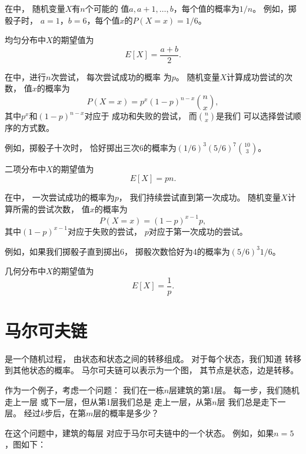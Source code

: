 在中，
随机变量$X$有$n$个可能的
值$a,a+1,\ldots,b$，每个值的概率为$1/n$。
例如，掷骰子时，
$a=1$，$b=6$，每个值$x$的$P(X=x)=1/6$。

均匀分布中$X$的期望值为
\[E[X] = \frac{a+b}{2}.\]

在中，进行$n$次尝试，
每次尝试成功的概率
为$p$。
随机变量$X$计算成功尝试的次数，
值$x$的概率为
\[P(X=x)=p^x (1-p)^{n-x} {n \choose x},\]
其中$p^x$和$(1-p)^{n-x}$对应于
成功和失败的尝试，
而${n \choose x}$是我们
可以选择尝试顺序的方式数。

例如，掷骰子十次时，
恰好掷出三次6的概率为$(1/6)^3 (5/6)^7 {10 \choose 3}$。

二项分布中$X$的期望值为
\[E[X] = pn.\]

在中，
一次尝试成功的概率为$p$，
我们持续尝试直到第一次成功。
随机变量$X$计算所需的尝试次数，
值$x$的概率为
\[P(X=x)=(1-p)^{x-1} p,\]
其中$(1-p)^{x-1}$对应于失败的尝试，
$p$对应于第一次成功的尝试。

例如，如果我们掷骰子直到掷出6，
掷骰次数恰好为4的概率为$(5/6)^3 1/6$。

几何分布中$X$的期望值为
\[E[X]=\frac{1}{p}.\]

\section{马尔可夫链}


是一个随机过程，
由状态和状态之间的转移组成。
对于每个状态，我们知道
转移到其他状态的概率。
马尔可夫链可以表示为一个图，
其节点是状态，边是转移。

作为一个例子，考虑一个问题：
我们在一栋$n$层建筑的第1层。
每一步，我们随机走上一层
或下一层，但从第1层我们总是
走上一层，从第$n$层
我们总是走下一层。
经过$k$步后，在第$m$层的概率是多少？

在这个问题中，建筑的每层
对应于马尔可夫链中的一个状态。
例如，如果$n=5$，图如下：

